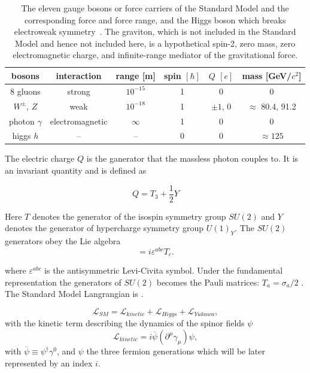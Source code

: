 \begin{table}
	\centering
	\begin{tabular}{| c || c | c | c | c | c |}
		\hline
		bosons & interaction & range [m] & spin $[\hbar]$ & $Q$ $[e]$ & mass [GeV/$c^2$]\\\hline\hline
		8 gluons &  strong  & $10^{-15}$ & 1 & 0 & 0 \\\hline
		$W^\pm$, $Z$ & weak  & $ 10^{-18}$ & 1 & $\pm 1$, 0 & $\approx$ 80.4, 91.2 \\\hline
		photon $\gamma$ &  electromagnetic  & $\infty$ & 1 & 0 & 0 \\\hline\hline
		higgs $h$ &  --  &  -- & 0 & 0 & $\approx 125$ \\\hline
		
	\end{tabular}
	\caption{
		The eleven gauge bosons or force carriers of the Standard Model and the corresponding force and force range, and the Higgs boson which breaks electroweak symmetry~\cite{pdg12}.
		The graviton, which is not included in the Standard Model and hence not included here, is a hypothetical spin-2, zero mass, zero electromagnetic charge, and infinite-range mediator of the gravitational force.
	}
	\label{table::bosons}
\end{table}

The electric charge $Q$ is the ganerator that the massless photon couples to. It is an invariant quantity and is defined as \cite{zee2003quantum}

\begin{equation}
Q = T_3 + \frac{1}{2}Y
\label{eqn:electricchargegenerator}
\end{equation}

Here $T$ denotes the generator of the isospin symmetry group $SU(2)$ and $Y$ denotes the generator of hypercharge symmetry group $U(1)_Y$. The $SU(2)$ generators obey the Lie algebra
\begin{equation}
[T^a, T^b] = i\varepsilon^{abc}T_c.
\label{eqn:su2liealgebr}
\end{equation}

where $\varepsilon^{abc}$ is the antisymmetric Levi-Civita symbol. Under the fundamental representation the generators of $SU(2)$  becomes the Pauli matrices: $T_a = \sigma_a/2$ \cite{roubillard2005th}. The Standard Model Langrangian is \cite{noteskooijman11}.

\begin{equation}
\mathcal L_{SM} = \mathcal L_{kinetic} + \mathcal L_{Higgs} + \mathcal L_{Yukawa},
\label{eqn:SMLagrangian}
\end{equation}
with the kinetic term describing the dynamics of the spinor fields $\psi$
\begin{equation}
\mathcal L_{kinetic} = i\overline{\psi}(\partial^\mu\gamma_\mu)\psi,
\label{eqn:SMLkinetic}
\end{equation}
with $\overline{\psi} \equiv \psi^\dag\gamma^0$, and $\psi$ the three fermion generations which will be later represented by an index $i$. 

